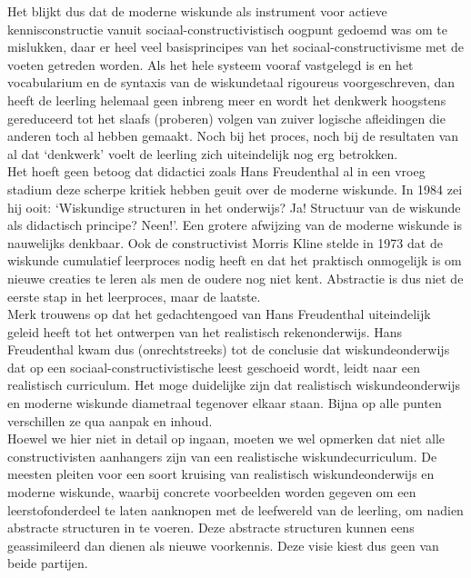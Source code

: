 \documentclass[a4paper,11pt]{article}
\begin{document}
\noindent Het blijkt dus dat de moderne wiskunde als instrument voor actieve 
kennisconstructie vanuit sociaal-constructivistisch oogpunt gedoemd was om te 
mislukken, daar er heel veel basisprincipes van het sociaal-constructivisme met 
de voeten getreden worden. Als het hele systeem vooraf vastgelegd is en het vocabularium en de syntaxis van de wiskundetaal 
rigoureus voorgeschreven, dan heeft de leerling helemaal geen inbreng meer en wordt het denkwerk hoogstens gereduceerd
 tot het slaafs (proberen) volgen van zuiver logische afleidingen die anderen toch al hebben gemaakt. 
Noch bij het proces, noch bij de resultaten van al dat `denkwerk' voelt de leerling zich uiteindelijk nog erg betrokken. 
\\

\noindent Het hoeft geen betoog dat didactici zoals Hans Freudenthal al in een vroeg stadium deze scherpe kritiek 
hebben geuit over de moderne wiskunde. In 1984 zei hij ooit: `Wiskundige structuren in het onderwijs? Ja! 
Structuur van de wiskunde als didactisch principe? Neen!'. Een grotere afwijzing 
van de moderne wiskunde is nauwelijks denkbaar. Ook de constructivist Morris Kline stelde in 1973 dat
de wiskunde cumulatief leerproces nodig heeft en dat het praktisch onmogelijk is om nieuwe creaties te leren als men de oudere nog niet kent.
Abstractie is dus niet de eerste stap in het leerproces, maar de laatste. \\

\noindent Merk trouwens op dat het gedachtengoed van Hans Freudenthal 
uiteindelijk geleid heeft tot het ontwerpen van het realistisch rekenonderwijs. 
Hans Freudenthal kwam dus (onrechtstreeks) tot de conclusie dat 
wiskundeonderwijs dat op een sociaal-constructivistische leest geschoeid wordt, 
leidt naar een realistisch curriculum. Het moge duidelijke zijn dat realistisch 
wiskundeonderwijs en moderne wiskunde diametraal tegenover elkaar staan. Bijna 
op alle punten verschillen ze qua aanpak en inhoud.\\

\noindent Hoewel we hier niet in detail op ingaan, 
moeten we wel opmerken dat niet alle constructivisten aanhangers zijn van een realistische wiskundecurriculum. 
De meesten pleiten voor een soort kruising van realistisch wiskundeonderwijs en moderne wiskunde, waarbij 
concrete voorbeelden worden gegeven om een leerstofonderdeel te laten aanknopen met de leefwereld van de leerling, om 
nadien abstracte structuren in te voeren. Deze abstracte structuren kunnen eens geassimileerd dan dienen als nieuwe
voorkennis. Deze visie kiest dus geen van beide partijen.
\end{document}
